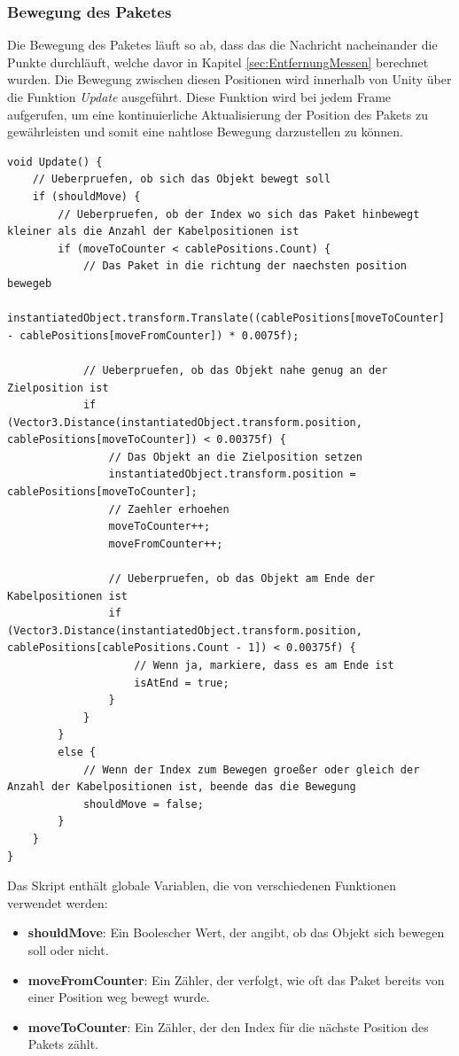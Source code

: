 \subsubsection{Bewegung des Paketes}
Die Bewegung des Paketes läuft so ab, dass das die Nachricht nacheinander die Punkte durchläuft, welche davor in Kapitel \ref{sec:EntfernungMessen} berechnet wurden. Die Bewegung zwischen diesen Positionen wird innerhalb von Unity über die Funktion \textit{Update} ausgeführt. Diese Funktion wird bei jedem Frame aufgerufen, um eine kontinuierliche Aktualisierung der Position des Pakets zu gewährleisten und somit eine nahtlose Bewegung darzustellen zu können.
\begin{lstlisting}[style=csharp, caption={Update Funktion}, label=code:Update]
void Update() {
    // Ueberpruefen, ob sich das Objekt bewegt soll
    if (shouldMove) {
        // Ueberpruefen, ob der Index wo sich das Paket hinbewegt kleiner als die Anzahl der Kabelpositionen ist
        if (moveToCounter < cablePositions.Count) {
            // Das Paket in die richtung der naechsten position bewegeb
            instantiatedObject.transform.Translate((cablePositions[moveToCounter] - cablePositions[moveFromCounter]) * 0.0075f);

            // Ueberpruefen, ob das Objekt nahe genug an der Zielposition ist
            if (Vector3.Distance(instantiatedObject.transform.position, cablePositions[moveToCounter]) < 0.00375f) {
                // Das Objekt an die Zielposition setzen
                instantiatedObject.transform.position = cablePositions[moveToCounter];
                // Zaehler erhoehen
                moveToCounter++;
                moveFromCounter++;

                // Ueberpruefen, ob das Objekt am Ende der Kabelpositionen ist
                if (Vector3.Distance(instantiatedObject.transform.position, cablePositions[cablePositions.Count - 1]) < 0.00375f) {
                    // Wenn ja, markiere, dass es am Ende ist
                    isAtEnd = true;
                }
            }
        }
        else {
            // Wenn der Index zum Bewegen groeßer oder gleich der Anzahl der Kabelpositionen ist, beende das die Bewegung
            shouldMove = false;
        }
    }
}

\end{lstlisting}Das Skript enthält globale Variablen, die von verschiedenen Funktionen verwendet werden:

\begin{itemize}
    \item \textbf{shouldMove}: Ein Boolescher Wert, der angibt, ob das Objekt sich bewegen soll oder nicht.
    \item \textbf{moveFromCounter}: Ein Zähler, der verfolgt, wie oft das Paket bereits von einer Position weg bewegt wurde.
    \item \textbf{moveToCounter}: Ein Zähler, der den Index für die nächste Position des Pakets zählt.
\end{itemize}

